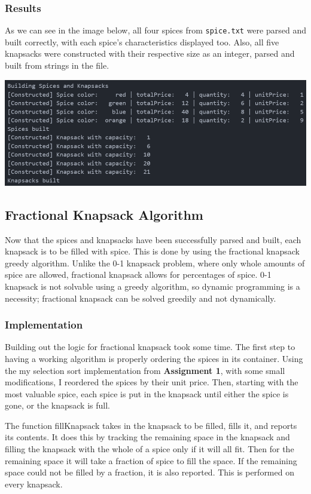 \documentclass[12pt, letterpaper]{article}
\begin{document}
\subsubsection{Results}
As we can see in the image below, all four spices from \texttt{spice.txt} were parsed and built correctly, with each spice's characteristics displayed too.
Also, all five knapsacks were constructed with their respective size as an integer, parsed and built from strings in the file.
\begin{center}
   \includegraphics{images/SpiceKnapsack_ParseBuild.png}
\end{center}

\subsection{Fractional Knapsack Algorithm} \label{SpiceKnapsack_FKA}
Now that the spices and knapsacks have been successfully parsed and built, each knapsack is to be filled with spice.
This is done by using the fractional knapsack greedy algorithm.
Unlike the 0-1 knapsack problem, where only whole amounts of spice are allowed, fractional knapsack allows for percentages of spice.
0-1 knapsack is not solvable using a greedy algorithm, so dynamic programming is a necessity; fractional knapsack can be solved greedily and not dynamically.
\subsubsection{Implementation}
Building out the logic for fractional knapsack took some time.
The first step to having a working algorithm is properly ordering the spices in its container.
Using the my selection sort implementation from \textbf{Assignment 1}, with some small modifications, I reordered the spices by their unit price.
Then, starting with the most valuable spice, each spice is put in the knapsack until either the spice is gone, or the knapsack is full.
\begin{center}
   
\end{center}
The function fillKnapsack takes in the knapsack to be filled, fills it, and reports its contents.
It does this by tracking the remaining space in the knapsack and filling the knapsack with the whole of a spice only if it will all fit.
Then for the remaining space it will take a fraction of spice to fill the space.
If the remaining space could not be filled by a fraction, it is also reported.
This is performed on every knapsack.
\end{document}
